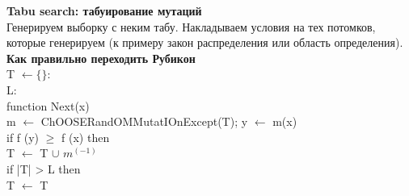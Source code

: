 \textbf{Tabu search: табуирование мутаций} \\ 
Генерируем выборку с неким табу. Накладываем условия на тех потомков, которые генерируем (к примеру закон распределения или область определения). \\
\textbf{Как правильно переходить Рубикон} \\
T $\leftarrow \lbrace \rbrace$:  \\
L:  \\
function Next(x)  \\
\tab m $\leftarrow$ ChOOSERandOMMutatIOnExcept(T); y $\leftarrow$ m(x)  \\
\tab if f (y) $\ge$ f (x) then  \\
\tab \tab T $\leftarrow$ T $\cup$ { $m^{(-1)}$} \\ 
\tab \tab if |T| > L then \\ 
\tab \tab \tab T $\leftarrow$ T   \\
\tab \tab {}  \\
\tab \tab {}  \\
\tab {}  \\
\tab {}  \\
  \\
